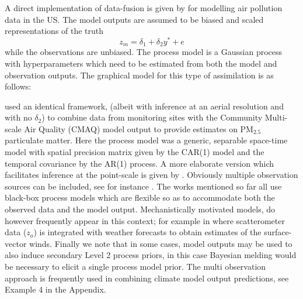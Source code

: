 \documentclass[10pt,a4paper]{article}
\begin{document}
A direct implementation of data-fusion is given by \citep{Fuentes_2005} for modelling air pollution data in the US. The model outputs are assumed to be biased and scaled representations of the truth
\begin{equation}
z_m = \delta_1 + \delta_2y^* + e
\end{equation}
\noindent while the observations are unbiased. The process model is a Gaussian process with hyperparameters which need to be estimated from both the model and observation outputs. The graphical model for this type of assimilation is as follows:
\begin{figure}[h!]
\centering
{}
\end{figure}

\noindent \cite{McMillan_2010} used an identical framework, (albeit with inference at an aerial resolution and with no $\delta_2$) to combine data from monitoring sites with the Community Multi-scale Air Quality (CMAQ) model output to provide estimates on PM$_{2.5}$ particulate matter. Here the process model was a generic, separable space-time model with spatial precision matrix given by the CAR(1) model \citep{Rue_2005} and the temporal covariance by the AR(1) process. A more elaborate version which facilitates inference at the point-scale is given by \cite{Sahu_2010}. Obviously multiple observation sources can be included, see for instance \cite{Smith_2007}. The works mentioned so far all use black-box process models which are flexible so as to accommodate both the observed data and the model output. Mechanistically motivated models, do however frequently appear in this context; for example in \citep{Milliff_2011} where scatterometer data ($z_o$) is integrated with weather forecasts to obtain estimates of the surface-vector winds. Finally we note that in some cases, model outputs may be used to also induce secondary Level 2 process priors, in this case Bayesian melding \citep{Poole_2000} would be necessary to elicit a single process model prior.  The multi observation approach is frequently used in combining climate model output predictions, see Example 4 in the Appendix.
\end{document}
